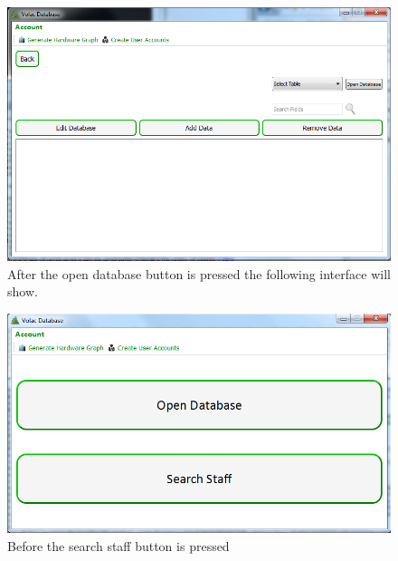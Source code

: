 \begin{figure}[H]
    \includegraphics[width=\textwidth]{./Testing/Images/OpenDatabaseInterface.png}
    \caption{After the open database button is pressed the following interface will show.} \label{fig:OpenDatabaseInterface}
\end{figure}

\begin{figure}[H]
    \includegraphics[width=\textwidth]{./Testing/Images/AdminInterface.png}
    \caption{Before the search staff button is pressed} \label{fig:SearchStaffInterfaceBF}
\end{figure}

